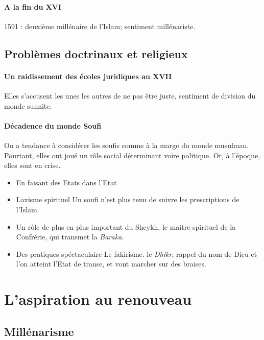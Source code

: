  \paragraph{A la fin du XVI} 1591 : deuxième millénaire de l'Islam; sentiment millénariste. 
 
 
 
\subsection{Problèmes doctrinaux et religieux}

\paragraph{Un raidissement des écoles juridiques au XVII}
Elles s'accusent les unes les autres de ne pas être juste, sentiment de division du monde sunnite.

\paragraph{Décadence du monde Soufi} On a tendance à considérer les soufis comme à la marge du monde musulman. Pourtant, elles ont joué un rôle social déterminant voire politique. Or, à l'époque, elles sont en crise.
\begin{itemize}
    \item {En faisant des Etats dans l'Etat} 
\item {Laxisme spirituel} Un soufi n'est plus tenu de suivre les prescriptions de l'Islam.
\item {Un rôle de plus en plus important du Sheykh}, le maitre spirituel de la Confrérie, qui transmet la \emph{Baraka}.
\item {Des pratiques spéctaculaire} Le fakirisme. le \emph{Dhikr}, rappel du nom de Dieu et l'on atteint l'Etat de transe, et vont marcher sur des braises. 

\end{itemize}



\section{L'aspiration au
  renouveau}
\subsection{Millénarisme}


